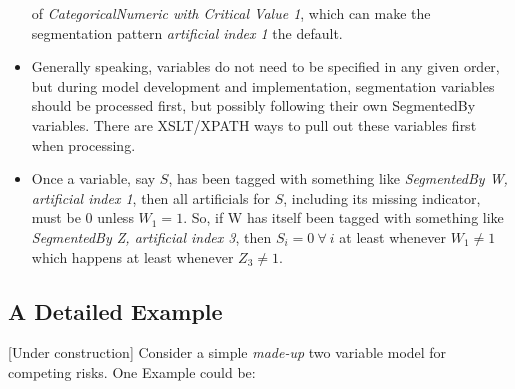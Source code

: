 \documentclass[10pt]{article}
\begin{document}
\begin{itemize}
        of {\em CategoricalNumeric with Critical Value 1}, which can make the segmentation pattern {\em artificial index 1}
        the default.
    \item Generally speaking, variables do not need to be specified in any given order, but during model 
        development and implementation, segmentation variables should be processed first, but possibly following their own SegmentedBy
        variables.  There are XSLT/XPATH ways to pull out these variables first when processing.
    \item Once a variable, say $S$, has been tagged with something like {\em SegmentedBy W, artificial index 1}, 
        then all artificials for $S$, including its missing indicator, must be 0 unless $W_1=1$.
        So, if W has itself been tagged with something like {\em SegmentedBy Z, artificial index 3}, then
        $S_i=0~\forall~i$ at least whenever $W_1 \ne 1$ which happens at least whenever $Z_3 \ne 1$.
\end{itemize}




\subsection{A Detailed Example}

[Under construction]
Consider a simple {\em made-up} two variable model for competing risks.  One Example could be:
\end{document}

